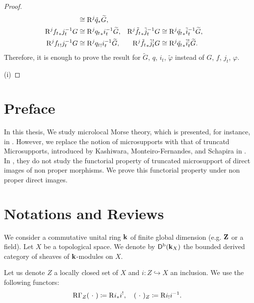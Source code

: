 \begin{proof}
\begin{align*}
    &\cong 
    \Rder[j]{\tilde{q}_{\ast}}\widetilde{G},
    \\
    \Rder[j]{{f_{t}}_{\ast}}j_{t}^{-1}G
    &\cong 
    \Rder[j]{{q_{t}}_{\ast}}i_{t}^{-1}\widetilde{G},
    &
    \Rder[j]{\tilde{f_{t}}_{\ast}}\tilde{j}_{t}^{-1}G
    &\cong 
    \Rder[j]{\tilde{q_{t}}_{\ast}}\tilde{i}_{t}^{-1}\widetilde{G},
    \\
    \Rder[j]{{f_{t}}_{!}}j_{t}^{-1}G
    &\cong 
    \Rder[j]{{q_{t}}_{!}}i_{t}^{-1}\widetilde{G},
    &
    \Rder[j]{\tilde{f_{t}}_{\ast}}\tilde{j}_{t}^{!}G
    &\cong 
    \Rder[j]{\tilde{q_{t}}_{\ast}}\tilde{i}_{t}^{!}\widetilde{G}.    
  \end{align*}
  Therefore, it is enough to prove the result for \(\widetilde{G}\), \(q\), \(i_t\), \(\tilde{\varphi}\) instead of \(G\), \(f\), \(j_t\), \(\varphi\). 

  (i) 

\end{proof}

\section{Preface}
In this thesis, 
We study microlocal Morse theory, which is presented, 
for instance, in \cite{GKS12}. 
However, we replace the notion of microsupports with
that of truncatd Microsupports, introduced by 
Kashiwara, Monteiro-Fernandes, and Schapira in \cite{KFS03}.
In \cite{KFS03}, they do not study the functorial property of 
truncated microsupport of direct images of non proper morphisms. 
We prove this functorial property under non proper direct images. 

\section{Notations and Reviews}

We consider a commutative unital ring \(\kk\) 
of finite global dimension (e.g. \(\zz\) or a field). 
Let \(X\) be a topological space. 
We denote by \(\Dompb(\kk_X)\) the bounded derived category of 
sheaves of \(\kk\)-modules on \(X\). 

Let us denote \(Z\) a locally closed set of \(X\) 
and \(i\colon Z\hookrightarrow X\) an inclusion. 
We use the following functors: 
\[
  \RG_{Z}(\blk) \coloneqq \Rder[]{i_{\ast}}i^{!}, 
  \quad
  (\blk)_{Z}\coloneqq \Rder[]{i_{!}}i^{-1}.
\]

